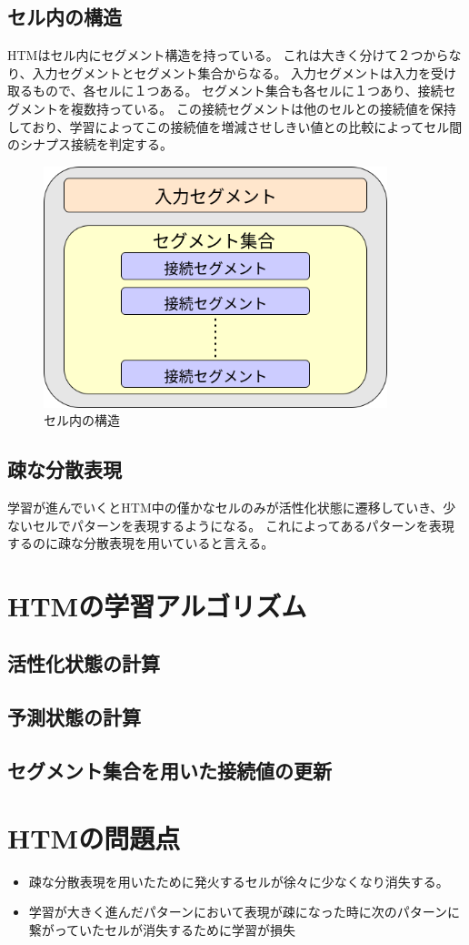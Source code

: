 \subsection{セル内の構造}
HTMはセル内にセグメント構造を持っている。
これは大きく分けて２つからなり、入力セグメントとセグメント集合からなる。
入力セグメントは入力を受け取るもので、各セルに１つある。
セグメント集合も各セルに１つあり、接続セグメントを複数持っている。
この接続セグメントは他のセルとの接続値を保持しており、学習によってこの接続値を増減させしきい値との比較によってセル間のシナプス接続を判定する。

\vspace{5mm}
\begin{figure}[ht]
  \begin{center}
    \includegraphics[width=10cm]{./fig/drawing_4}
    \caption{セル内の構造}
    \label{fig:cell_structure}
  \end{center}
\end{figure}

\subsection{疎な分散表現}
学習が進んでいくとHTM中の僅かなセルのみが活性化状態に遷移していき、少ないセルでパターンを表現するようになる。
これによってあるパターンを表現するのに疎な分散表現を用いていると言える。

\section{HTMの学習アルゴリズム}
\subsection{活性化状態の計算}
\subsection{予測状態の計算}
\subsection{セグメント集合を用いた接続値の更新}


\section{HTMの問題点}
\begin{itemize}
  \item 疎な分散表現を用いたために発火するセルが徐々に少なくなり消失する。
  \item 学習が大きく進んだパターンにおいて表現が疎になった時に次のパターンに繋がっていたセルが消失するために学習が損失
\end{itemize}
